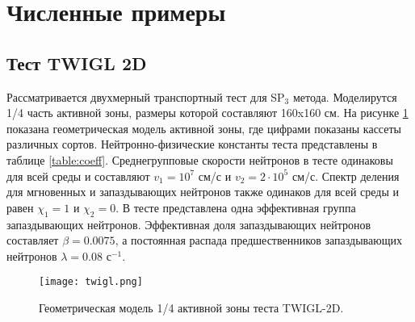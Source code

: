 \documentclass[a4paper,12pt]{article}
\begin{document}

\section{Численные примеры}

\subsection{Тест TWIGL 2D}
Рассматривается двухмерный транспортный тест \cite{twigl} для SP$_3$ метода. 
Моделирутся 1/4 часть активной зоны, размеры которой составляют 160x160 см.
На рисунке \ref{ris:twigl} показана геометрическая модель активной зоны, где цифрами показаны кассеты различных сортов.  
Нейтронно-физические константы теста представлены в таблице \ref{table:coeff}. 
Среднегрупповые скорости нейтронов в тесте одинаковы для всей среды и составляют $v_1 = 10^7$ см/с и $v_2 = 2 \cdot 10^5$ см/с. 
Спектр деления для мгновенных и запаздывающих нейтронов также одинаков для всей среды и равен $\chi_1 = 1$ и $\chi_2 = 0$.
В тесте представлена одна эффективная группа запаздывающих нейтронов. 
Эффективная доля запаздывающих нейтронов составляет $\beta = 0.0075$, а постоянная распада предшественников запаздывающих нейтронов $\lambda = 0.08$ с$^{-1}$.  

\begin{figure}[ht]
\begin{center}
	\texttt{[image: twigl.png]}\\
	\caption{\label{image:canonsummary}Геометрическая модель 1/4 активной зоны теста TWIGL-2D.}
	\label{ris:twigl}
\end{center}
\end{figure}
\end{document}

